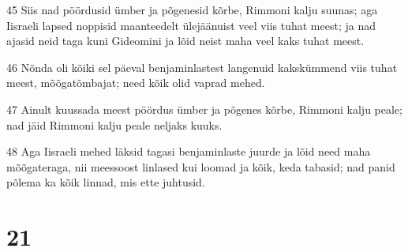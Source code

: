 \par 45 Siis nad pöördusid ümber ja põgenesid kõrbe, Rimmoni kalju suunas; aga Iisraeli lapsed noppisid maanteedelt ülejäänuist veel viis tuhat meest; ja nad ajasid neid taga kuni Gideomini ja lõid neist maha veel kaks tuhat meest.
\par 46 Nõnda oli kõiki sel päeval benjaminlastest langenuid kakskümmend viis tuhat meest, mõõgatõmbajat; need kõik olid vaprad mehed.
\par 47 Ainult kuussada meest pöördus ümber ja põgenes kõrbe, Rimmoni kalju peale; nad jäid Rimmoni kalju peale neljaks kuuks.
\par 48 Aga Iisraeli mehed läksid tagasi benjaminlaste juurde ja lõid need maha mõõgateraga, nii meessoost linlased kui loomad ja kõik, keda tabasid; nad panid põlema ka kõik linnad, mis ette juhtusid.

\chapter{21}

